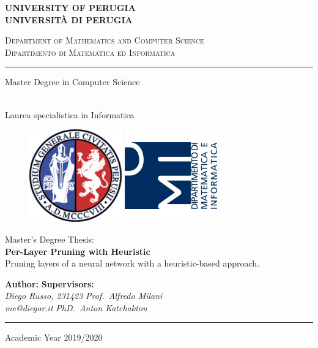 \begin{titlepage}
    \begin{center}
        \textbf{\Large UNIVERSITY OF PERUGIA}\\
        \textbf{UNIVERSITÀ DI PERUGIA}
        \vspace{0.5cm}

        \scshape{Department of Mathematics and Computer Science}\\
        \scshape{Dipartimento di Matematica ed Informatica}

        \rule[1mm]{\textwidth}{0.2mm}
        \vspace{0.5cm}

        \begin{Large}Master Degree in Computer Science\end{Large}\\
        Laurea specialistica in Informatica
        \vspace{0.5cm}

        \begin{figure}[htbp]
            \begin{center}
                \includegraphics[width=4cm]{images/unipg_logo.png}
                \includegraphics[width=4cm]{images/dmi_logo.png}
            \end{center}
        \end{figure}

        Master's Degree Thesis:\\
        \vspace{0.5cm}
        \textbf{\LARGE Per-Layer Pruning with Heuristic}\\
        \vspace{0.3cm}
        Pruning layers of a neural network with a heuristic-based approach.\\
        \vspace{2cm}

        \textbf{Author:} \hfill \textbf{Supervisors:}\\
        \textit{Diego Russo, 231423} \hfill \textit{Prof.\ Alfredo Milani}\\
        \textit{me@diegor.it} \hfill \textit{PhD.\ Anton Katchaktou}

        \rule[1mm]{\textwidth}{0.2mm}
        \small{Academic Year 2019/2020}
    \end{center}
\end{titlepage}